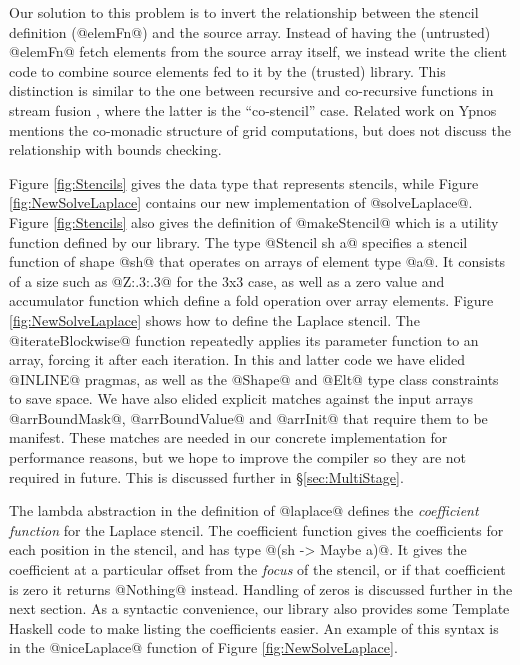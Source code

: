 Our solution to this problem is to invert the relationship between the stencil definition (@elemFn@) and the source array. Instead of having the (untrusted) @elemFn@ fetch elements from the source array itself, we instead write the client code to combine source elements fed to it by the (trusted) library. This distinction is similar to the one between recursive and co-recursive functions in stream fusion \cite{Coutts:stream-fusion}, where the latter is the ``co-stencil'' case. Related work on Ypnos \cite{Orchard:ypnos} mentions the co-monadic structure of grid computations, but does not discuss the relationship with bounds checking. 

Figure \ref{fig:Stencils} gives the data type that represents stencils, while Figure \ref{fig:NewSolveLaplace} contains our new implementation of @solveLaplace@. Figure \ref{fig:Stencils} also gives the definition of @makeStencil@ which is a utility function defined by our library. The type @Stencil sh a@ specifies a stencil function of shape @sh@ that operates on arrays of element type @a@. It consists of a size such as @Z:.3:.3@ for the 3x3 case, as well as a zero value and accumulator function which define a fold operation over array elements. Figure \ref{fig:NewSolveLaplace} shows how to define the Laplace stencil. The @iterateBlockwise@ function repeatedly applies its parameter function to an array, forcing it after each iteration. In this and latter code we have elided @INLINE@ pragmas, as well as the @Shape@ and @Elt@ type class constraints to save space. We have also elided explicit matches against the input arrays @arrBoundMask@, @arrBoundValue@ and @arrInit@ that require them to be manifest. These matches are needed in our concrete implementation for performance reasons, but we hope to improve the compiler so they are not required in future. This is discussed further in \S\ref{sec:MultiStage}. 

The lambda abstraction in the definition of @laplace@ defines the \emph{coefficient function} for the Laplace stencil. The coefficient function gives the coefficients for each position in the stencil, and has type @(sh -> Maybe a)@. It gives the coefficient at a particular offset from the \emph{focus} of the stencil, or if that coefficient is zero it returns @Nothing@ instead. Handling of zeros is discussed further in the next section. As a syntactic convenience, our library also provides some Template Haskell code to make listing the coefficients easier. An example of this syntax is in the @niceLaplace@ function of  Figure \ref{fig:NewSolveLaplace}.
 
